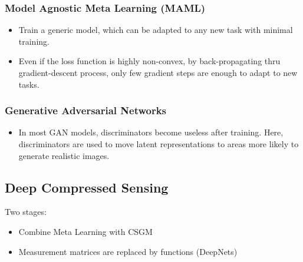 \documentclass{article}
\begin{document}
    \subsubsection{Model Agnostic Meta Learning (MAML)}\label{subsubsec:Deep_Compressed_Sensing:maml}
    \begin{itemize}
        \item Train a generic model, which can be adapted to any new task with minimal training.
        \item Even if the loss function is highly non-convex, by back-propagating thru gradient-descent process, only few gradient steps are enough to adapt to new tasks.
    \end{itemize}

    \subsubsection{Generative Adversarial Networks}\label{subsubsec:Deep_Compressed_Sensing:gans}
    \begin{itemize}
        \item In most GAN models, discriminators become useless after training.
        Here, discriminators are used to move latent representations to areas more likely to generate realistic images.
    \end{itemize}

    \subsection{Deep Compressed Sensing}\label{subsec:Deep_Compressed_Sensing:dcs}
    Two stages:
    \begin{itemize}
        \item Combine Meta Learning with CSGM
        \item Measurement matrices are replaced by functions (DeepNets)
    \end{itemize}
\end{document}
